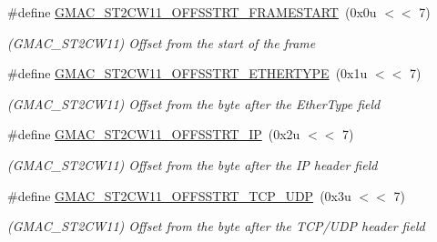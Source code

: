 \begin{DoxyCompactItemize}
\item 
\mbox{\label{group__SAME70__GMAC_gab232b096f7789e863a94d0d3ba0dfc0c}} 
\#define \mbox{\hyperlink{group__SAME70__GMAC_gab232b096f7789e863a94d0d3ba0dfc0c}{G\+M\+A\+C\+\_\+\+S\+T2\+C\+W11\+\_\+\+O\+F\+F\+S\+S\+T\+R\+T\+\_\+\+F\+R\+A\+M\+E\+S\+T\+A\+RT}}~(0x0u $<$$<$ 7)
\begin{DoxyCompactList}\small\item\em (G\+M\+A\+C\+\_\+\+S\+T2\+C\+W11) Offset from the start of the frame \end{DoxyCompactList}\item 
\mbox{\label{group__SAME70__GMAC_ga016caa5db9bdaf635e8edb926cee9f40}} 
\#define \mbox{\hyperlink{group__SAME70__GMAC_ga016caa5db9bdaf635e8edb926cee9f40}{G\+M\+A\+C\+\_\+\+S\+T2\+C\+W11\+\_\+\+O\+F\+F\+S\+S\+T\+R\+T\+\_\+\+E\+T\+H\+E\+R\+T\+Y\+PE}}~(0x1u $<$$<$ 7)
\begin{DoxyCompactList}\small\item\em (G\+M\+A\+C\+\_\+\+S\+T2\+C\+W11) Offset from the byte after the Ether\+Type field \end{DoxyCompactList}\item 
\mbox{\label{group__SAME70__GMAC_ga30158e102fa028fda2b792da21e45531}} 
\#define \mbox{\hyperlink{group__SAME70__GMAC_ga30158e102fa028fda2b792da21e45531}{G\+M\+A\+C\+\_\+\+S\+T2\+C\+W11\+\_\+\+O\+F\+F\+S\+S\+T\+R\+T\+\_\+\+IP}}~(0x2u $<$$<$ 7)
\begin{DoxyCompactList}\small\item\em (G\+M\+A\+C\+\_\+\+S\+T2\+C\+W11) Offset from the byte after the IP header field \end{DoxyCompactList}\item 
\mbox{\label{group__SAME70__GMAC_gaf23f541bf8ed39537580c88f9b466aaa}} 
\#define \mbox{\hyperlink{group__SAME70__GMAC_gaf23f541bf8ed39537580c88f9b466aaa}{G\+M\+A\+C\+\_\+\+S\+T2\+C\+W11\+\_\+\+O\+F\+F\+S\+S\+T\+R\+T\+\_\+\+T\+C\+P\+\_\+\+U\+DP}}~(0x3u $<$$<$ 7)
\begin{DoxyCompactList}\small\item\em (G\+M\+A\+C\+\_\+\+S\+T2\+C\+W11) Offset from the byte after the T\+C\+P/\+U\+DP header field \end{DoxyCompactList}\item 
\mbox{\label{group__SAME70__GMAC_ga6793690c08f59e954b52ea685b16d187}} 

\end{DoxyCompactItemize}
